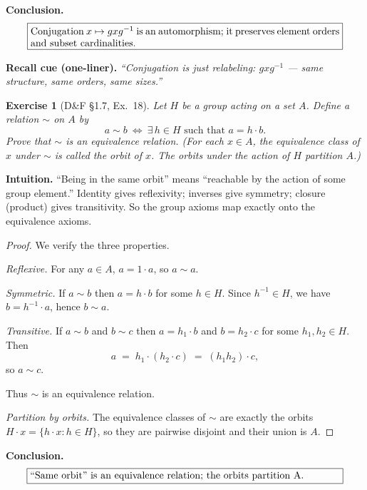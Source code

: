 \documentclass[12pt]{article}
\newtheorem{exercise}[theorem]{Exercise}
\theoremstyle{definition}
\begin{document}
\noindent\textbf{Conclusion.}
\[
\boxed{\parbox{0.9\linewidth}{
Conjugation $x\mapsto gxg^{-1}$ is an automorphism; 
it preserves element orders and subset cardinalities.
}}
\]

\medskip
\noindent\textbf{Recall cue (one-liner).} \emph{“Conjugation is just relabeling: $gxg^{-1}$ — same structure, same orders, same sizes.”}

\newpage

\begin{exercise}[D\&F §1.7, Ex.~18]
Let $H$ be a group acting on a set $A$. Define a relation $\sim$ on $A$ by
\[
a \sim b \ \Longleftrightarrow\ \exists\,h\in H\text{ such that }a=h\cdot b.
\]
Prove that $\sim$ is an equivalence relation. (For each $x\in A$, the
equivalence class of $x$ under $\sim$ is called the \emph{orbit} of $x$.
The orbits under the action of $H$ partition $A$.)
\end{exercise}

\dotfill

\noindent\textbf{Intuition.}
“Being in the same orbit” means “reachable by the action of some group element.”
Identity gives reflexivity; inverses give symmetry; closure (product) gives transitivity.
So the group axioms map exactly onto the equivalence axioms.

\dotfill

\begin{proof}
We verify the three properties.

\smallskip
\noindent\emph{Reflexive.} For any $a\in A$, $a = 1\cdot a$, so $a\sim a$.

\smallskip
\noindent\emph{Symmetric.} If $a\sim b$ then $a=h\cdot b$ for some $h\in H$.
Since $h^{-1}\in H$, we have $b=h^{-1}\cdot a$, hence $b\sim a$.

\smallskip
\noindent\emph{Transitive.} If $a\sim b$ and $b\sim c$ then $a=h_1\cdot b$ and
$b=h_2\cdot c$ for some $h_1,h_2\in H$. Then
\[
a \;=\; h_1\cdot (h_2\cdot c)\;=\;(h_1h_2)\cdot c,
\]
so $a\sim c$.

Thus $\sim$ is an equivalence relation.

\smallskip
\noindent\emph{Partition by orbits.} The equivalence classes of $\sim$ are exactly the
orbits $H\cdot x=\{h\cdot x:h\in H\}$, so they are pairwise disjoint and their union is $A$.
\end{proof}

\noindent\textbf{Conclusion.}
\[
\boxed{\parbox{0.9\linewidth}{
“Same orbit” is an equivalence relation; the orbits partition A.
}}
\]
\end{document}
